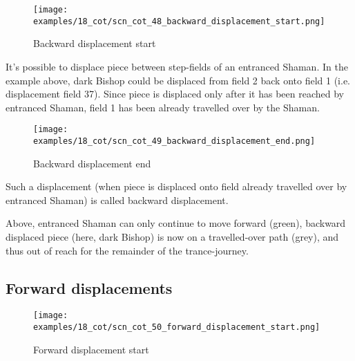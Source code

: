 \noindent
\begin{figure}[!h]
\vspace{-1.0\baselineskip}
\texttt{[image: examples/18\_cot/scn\_cot\_48\_backward\_displacement\_start.png]}
\caption{Backward displacement start}
\label{fig:scn_cot_48_backward_displacement_start}
\end{figure}

It's possible to displace piece between step-fields of an entranced Shaman. In the
example above, dark Bishop could be displaced from field 2 back onto field 1 (i.e.
displacement field 37). Since piece is displaced only after it has been reached by
entranced Shaman, field 1 has been already travelled over by the Shaman.

\clearpage %

\noindent
\begin{figure}[!h]
\texttt{[image: examples/18\_cot/scn\_cot\_49\_backward\_displacement\_end.png]}
\caption{Backward displacement end}
\label{fig:scn_cot_49_backward_displacement_end}
\end{figure}

Such a displacement (when piece is displaced onto field already travelled over
by entranced Shaman) is called backward displacement.

Above, entranced Shaman can only continue to move forward (green), backward
displaced piece (here, dark Bishop) is now on a travelled-over path (grey),
and thus out of reach for the remainder of the trance-journey.

\clearpage %

\subsection*{Forward displacements}
\label{sec:Conquest of Tlalocan/Trance-journey/Forward displacements}

\vspace*{-1.0\baselineskip}
\noindent
\begin{figure}[!h]
\texttt{[image: examples/18\_cot/scn\_cot\_50\_forward\_displacement\_start.png]}
\caption{Forward displacement start}
\label{fig:scn_cot_50_forward_displacement_start}
\end{figure}

